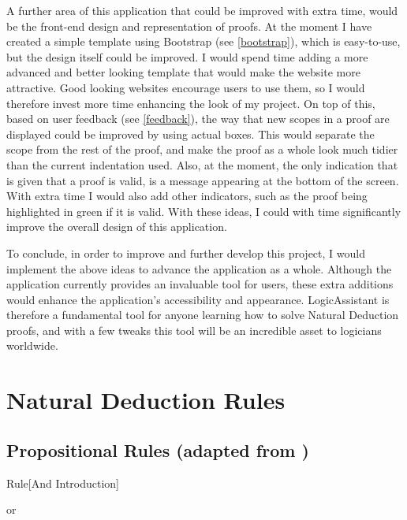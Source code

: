 A further area of this application that could be improved with extra time, would be the front-end design and representation of proofs. At the moment I have created a simple template using Bootstrap (see \ref{bootstrap}), which is easy-to-use, but the design itself could be improved. I would spend time adding a more advanced and better looking template that would make the website more attractive. Good looking websites encourage users to use them, so I would therefore invest more time enhancing the look of my project. On top of this, based on user feedback (see \ref{feedback}), the way that new scopes in a proof are displayed could be improved by using actual boxes. This would separate the scope from the rest of the proof, and make the proof as a whole look much tidier than the current indentation used. Also, at the moment, the only indication that is given that a proof is valid, is a message appearing at the bottom of the screen. With extra time I would also add other indicators, such as the proof being highlighted in green if it is valid. With these ideas, I could with time significantly improve the overall design of this application.

To conclude, in order to improve and further develop this project, I would implement the above ideas to advance the application as a whole. Although the application currently provides an invaluable tool for users, these extra additions would enhance the application's accessibility and appearance. LogicAssistant is therefore a fundamental tool for anyone learning how to solve Natural Deduction proofs, and with a few tweaks this tool will be an incredible asset to logicians worldwide.

\pagebreak
\appendix
\section{Natural Deduction Rules}
\label{appendix:nd}

\subsection{Propositional Rules (adapted from \cite{ndBook})}
\label{appendix:nd-prop}


\begin{namedthm}{Rule}[And Introduction]

\begin{bprooftree}
\end{bprooftree}\qquad or \qquad
\begin{bprooftree}
\end{bprooftree}

\end{namedthm}

